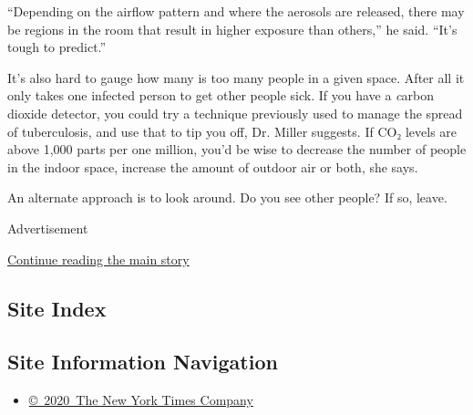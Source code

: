 ``Depending on the airflow pattern and where the aerosols are released,
there may be regions in the room that result in higher exposure than
others,'' he said. ``It's tough to predict.''

It's also hard to gauge how many is too many people in a given space.
After all it only takes one infected person to get other people sick. If
you have a \emph{c}arbon dioxide detector, you could try a technique
previously used to manage the spread of tuberculosis, and use that to
tip you off, Dr. Miller suggests. If CO₂ levels are above 1,000 parts
per one million, you'd be wise to decrease the number of people in the
indoor space, increase the amount of outdoor air or both, she says.

An alternate approach is to look around. Do you see other people? If so,
leave.

Advertisement

\protect\hyperlink{after-bottom}{Continue reading the main story}

\hypertarget{site-index}{%
\subsection{Site Index}\label{site-index}}

\hypertarget{site-information-navigation}{%
\subsection{Site Information
Navigation}\label{site-information-navigation}}

\begin{itemize}
\tightlist
\item
  \href{https://help.nytimes.com/hc/en-us/articles/115014792127-Copyright-notice}{©~2020~The
  New York Times Company}
\end{itemize}

